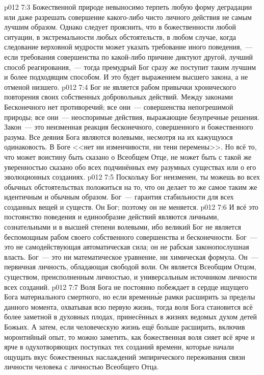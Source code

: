 \vs p012 7:3 Божественной природе невыносимо терпеть любую форму деградации или даже разрешать совершение какого\hyp{}либо чисто личного действия не самым лучшим образом. Однако следует прояснить, что  в божественности любой ситуации, в экстремальности любых обстоятельств, в любом случае, когда следование верховной мудрости может указать требование иного поведения,~--- если требования совершенства по какой\hyp{}либо причине диктуют другой, лучший способ реагирования,~--- тогда премудрый Бог сразу же поступит таким лучшим и более подходящим способом. И это будет выражением высшего закона, а не отменой низшего.
\vs p012 7:4 Бог не является рабом привычки хронического повторения своих собственных добровольных действий. Между законами Бесконечного нет противоречий; все они~--- совершенства непогрешимой природы; все они~--- неоспоримые действия, выражающие безупречные решения. Закон~--- это неизменная реакция бесконечного, совершенного и божественного разума. Все деяния Бога являются волевыми, несмотря на их кажущуюся одинаковость. В Боге <<нет ни изменчивости, ни тени перемены>>. Но всё то, что может воистину быть сказано о Всеобщем Отце, не может быть с такой же уверенностью сказано обо всех подчинённых ему разумных существах или о его эволюционных созданиях.
\vs p012 7:5 Поскольку Бог неизменен, ты можешь во всех обычных обстоятельствах положиться на то, что он делает то же самое таким же идентичным и обычным образом. Бог~--- гарантия стабильности для всех созданных вещей и существ. Он Бог; поэтому он не меняется.
\vs p012 7:6 И всё это постоянство поведения и единообразие действий являются личными, сознательными и в высшей степени волевыми, ибо великий Бог не является беспомощным рабом своего собственного совершенства и бесконечности. Бог~--- это не самодействующая автоматическая сила; он не рабская законопослушная власть. Бог~--- это ни математическое уравнение, ни химическая формула. Он~--- первичная личность, обладающая свободой воли. Он является Всеобщим Отцом, существом, преисполненным личностью, и универсальным источником личности всех созданий.
\vs p012 7:7 \pc Воля Бога не постоянно побеждает в сердце ищущего Бога материального смертного, но если временн\'ые рамки расширить за пределы данного момента, охватывая всю первую жизнь, тогда воля Бога становится всё более заметной в духовных плодах, принесённых в жизнях ведомых духом детей Божьих. А затем, если человеческую жизнь ещё больше расширить, включив моронтийный опыт, то можно заметить, как божественная воля сияет всё ярче и ярче в одухотворяющих поступках тех созданий времени, которые начали ощущать вкус божественных наслаждений эмпирического переживания связи личности человека с личностью Всеобщего Отца.
